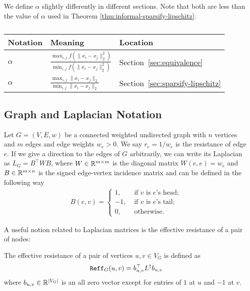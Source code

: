 We define $\alpha$ slightly differently in different sections. Note that both are less than the value of $\alpha$ used in Theorem \ref{thm:informal-sparsify-lipschitz}: 
\begin{table}[!h]\caption{}
\centering
\begin{tabular}{|l|l|l|}
    \hline
    Notation & Meaning & Location \\ \hline
    $\alpha$ & $\frac{ \max_{i,j} f(\| x_i - x_j \|_2^2) }{ \min_{i,j} f( \| x_i - x_j \|_2^2 ) }$  & Section~\ref{sec:equivalence}  \\ \hline
    $\alpha$ & $\frac{\max_{i,j} \| x_i - x_j \|_2 }{\min_{i,j} \| x_i - x_j \|_2}$ & Section~\ref{sec:sparsify-lipschitz} \\ \hline %
\end{tabular}
\end{table}


\subsection{Graph and Laplacian Notation}\label{sec:graph_Laplacian_notation}

Let $G = (V,E,w)$ be a connected weighted undirected graph with $n$ vertices and $m$ edges and edge weights $w_e > 0$. We say $r_e = 1/w_e$ is the resistance of edge $e$.
If we give a direction to the edges of $G$ arbitrarily, we can write its Laplacian as $L_G = B^\top W B$, where $W \in {\mathbb R}^{m \times m}$ is the diagonal matrix $W(e,e) = w_e$ and $B \in {\mathbb R}^{m \times n}$ is the signed edge-vertex incidence matrix and can be defined in the following way
\begin{align}\label{eq:def_Laplacian_B}
B(e,v) = \begin{cases}
1,  & \text{~if~$v$~is~$e$'s~head}; \\
-1, & \text{~if~$v$~is~$e$'s~tail};\\
0,  & \text{~otherwise.}
\end{cases}
\end{align}

A useful notion related to Laplacian matrices is the effective resistance of a pair of nodes:
\begin{definition}\label{def:effective_resistance}
The effective resistance of a pair of vertices $u,v \in V_G$ is defined as 
\begin{align*}
\mathtt{Reff}_G(u,v) = b_{u,v}^\top L^\dagger b_{u,v}
\end{align*}
where $b_{u,v} \in {\mathbb R}^{|V_G|}$ is an all zero vector except for entries of $1$ at $u$ and $-1$ at $v$.
\end{definition}

